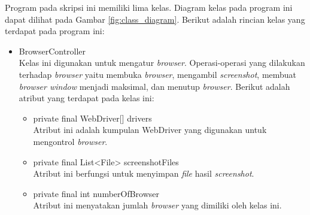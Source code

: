 Program pada skripsi ini memiliki lima kelas. Diagram kelas pada program ini dapat dilihat pada Gambar \ref{fig:class_diagram}. Berikut adalah rincian kelas yang terdapat pada program ini:
\begin{itemize}
\item BrowserController\\
Kelas ini digunakan untuk mengatur \textit{browser}. Operasi-operasi yang dilakukan terhadap \textit{browser} yaitu membuka \textit{browser}, mengambil \textit{screenshot}, membuat \textit{browser window} menjadi maksimal, dan menutup \textit{browser}. Berikut adalah atribut yang terdapat pada kelas ini:
\begin{itemize}
   \item private final WebDriver[] drivers\\
   Atribut ini adalah kumpulan WebDriver yang digunakan untuk mengontrol \textit{browser}. 
    \item private final List<File> screenshotFiles\\
	Atribut ini berfungsi untuk menyimpan \textit{file} hasil \textit{screenshot}.
	\item  private final int numberOfBrowser\\
	Atribut ini menyatakan jumlah \textit{browser} yang dimiliki oleh kelas ini.
\end{itemize}


\end{itemize}
